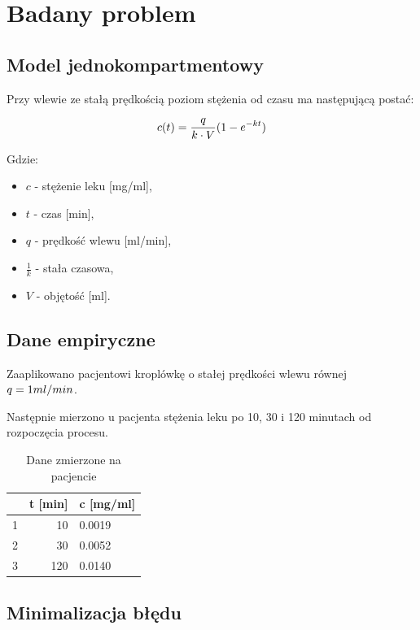\documentclass[12pt]{article}
\begin{document}
\section{Badany problem}

\subsection{Model jednokompartmentowy}

Przy wlewie ze stałą prędkością poziom stężenia od czasu ma następującą postać:

\begin{equation}
\Large
c(t) = \frac{q}{k \cdot V} (1 - e^{-kt})
\end{equation}

Gdzie:

\begin{itemize}
\item $c$ - stężenie leku [mg/ml],
\item $t$ - czas [min],
\item $q$ - prędkość wlewu [ml/min],
\item $\frac {1}{k}$ - stała czasowa,
\item $V$ - objętość [ml].
\end{itemize}

\subsection{Dane empiryczne}

Zaaplikowano pacjentowi kroplówkę o stałej prędkości wlewu równej
$q = 1 \space ml/min$.

Następnie mierzono u pacjenta stężenia leku po 10, 30 i 120 minutach od rozpoczęcia procesu.

\begin{table}[H]
\caption{Dane zmierzone na pacjencie}
\center
\begin{tabular}{c|r|l}
& \large t [min] & \large c [mg/ml] \\
\hline
1 & 10 & 0.0019 \\
2 & 30 & 0.0052 \\
3 & 120 & 0.0140 \\
\end{tabular}
\end{table}

\subsection{Minimalizacja błędu}
\end{document}
